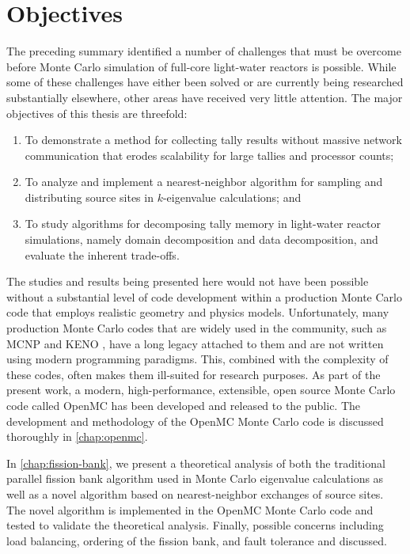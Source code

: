 \section{Objectives}

The preceding summary identified a number of challenges that must be overcome
before Monte Carlo simulation of full-core light-water reactors is
possible. While some of these challenges have either been solved or are
currently being researched substantially elsewhere, other areas have received
very little attention. The major objectives of this thesis are threefold:
\begin{enumerate}
\item To demonstrate a method for collecting tally results without massive
  network communication that erodes scalability for large tallies and processor
  counts;
\item To analyze and implement a nearest-neighbor algorithm for sampling and
  distributing source sites in $k$-eigenvalue calculations; and
\item To study algorithms for decomposing tally memory in light-water reactor
  simulations, namely domain decomposition and data decomposition, and evaluate
  the inherent trade-offs.
\end{enumerate}

The studies and results being presented here would not have been possible
without a substantial level of code development within a production Monte Carlo
code that employs realistic geometry and physics models. Unfortunately, many
production Monte Carlo codes that are widely used in the community, such as MCNP
and KENO \cite{ornl-petrie-1990}, have a long legacy attached to them and are
not written using modern programming paradigms. This, combined with the
complexity of these codes, often makes them ill-suited for research purposes. As
part of the present work, a modern, high-performance, extensible, open source
Monte Carlo code called OpenMC has been developed and released to the
public. The development and methodology of the OpenMC Monte Carlo code is
discussed thoroughly in \autoref{chap:openmc}.

In \autoref{chap:fission-bank}, we present a theoretical analysis of both the
traditional parallel fission bank algorithm used in Monte Carlo eigenvalue
calculations as well as a novel algorithm based on nearest-neighbor exchanges of
source sites. The novel algorithm is implemented in the OpenMC Monte Carlo code
and tested to validate the theoretical analysis. Finally, possible concerns
including load balancing, ordering of the fission bank, and fault tolerance and
discussed.

